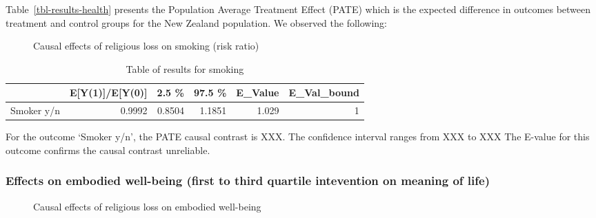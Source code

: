 \documentclass[
  singlecolumn,
  9pt]{scrartcl}
\begin{document}
Table~\ref{tbl-results-health} presents the Population Average Treatment
Effect (PATE) which is the expected difference in outcomes between
treatment and control groups for the New Zealand population. We observed
the following:

\begin{figure}


\caption{\label{fig-results-health-rr}Causal effects of religious loss
on smoking (risk ratio)}

\end{figure}%

\begin{longtable}[]{@{}lrrrrr@{}}

\caption{\label{tbl-results-health-rr}Table of results for smoking}

\tabularnewline

\toprule\noalign{}
& E{[}Y(1){]}/E{[}Y(0){]} & 2.5 \% & 97.5 \% & E\_Value &
E\_Val\_bound \\
\midrule\noalign{}
\endhead
\bottomrule\noalign{}
\endlastfoot
Smoker y/n & 0.9992 & 0.8504 & 1.1851 & 1.029 & 1 \\

\end{longtable}

For the outcome `Smoker y/n', the PATE causal contrast is XXX. The
confidence interval ranges from XXX to XXX The E-value for this outcome
confirms the causal contrast unreliable.

\subsubsection{Effects on embodied well-being (first to third quartile
intevention on meaning of
life)}\label{effects-on-embodied-well-being-first-to-third-quartile-intevention-on-meaning-of-life}

\begin{figure}


\caption{\label{fig-results-embodied}Causal effects of religious loss on
embodied well-being}

\end{figure}%
\end{document}

